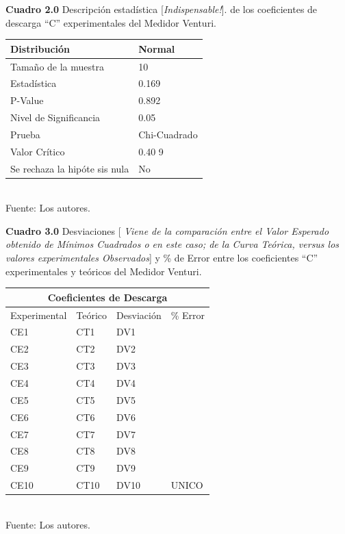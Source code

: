 \documentclass[11pt, letterpaper]{article}
\begin{document}
\begin{table}[ht]
\centering
\textbf{Cuadro 2.0} Descripción estadística [\emph{Indispensable!}]. de los coeficientes de descarga “C” experimentales del Medidor Venturi.\\
\begin{tabular}{|l|l|}
    \hline
    Distribución & Normal\\
    \hline
        Tamaño de la muestra & 10\\
        Estadística & 0.169\\ 
        P-Value & 0.892\\ 
        Nivel de Significancia & 0.05\\ 
        Prueba & Chi-Cuadrado\\
        Valor Crítico & 0.40    9\\
        Se rechaza la hipóte    sis nula & No\\
    \hline
    \end{tabular}\\
    Fuente: Los autores.
\end{table}

\begin{table}
\textbf{Cuadro 3.0}   Desviaciones [\emph{ Viene de la comparación entre el Valor Esperado obtenido de Mínimos Cuadrados o en este caso; de la Curva Teórica, versus los valores experimentales Observados}] y \% de Error entre los coeficientes “C” experimentales y teóricos del Medidor Venturi.\\
\centering
\begin{tabular}{|l|l|l|l|}
    \hline
    \multicolumn{4}{|c|}{Coeficientes de Descarga}\\
    \hline
        Experimental & Teórico & Desviación & \% Error \\
    \hline
        CE1 & CT1 & DV1 & \\
        CE2 & CT2 & DV2 & \\
        CE3 & CT3 & DV3 & \\
        CE4 & CT4 & DV4 & \\
        CE5 & CT5 & DV5 & \\
        CE6 & CT6 & DV6 & \\
        CE7 & CT7 & DV7 & \\
        CE8 & CT8 & DV8 & \\
        CE9 & CT9 & DV9 & \\
        CE10 & CT10 & DV10 & UNICO \\
    \hline
    \end{tabular}\\
    Fuente: Los autores.
\end{table}
\end{document}
